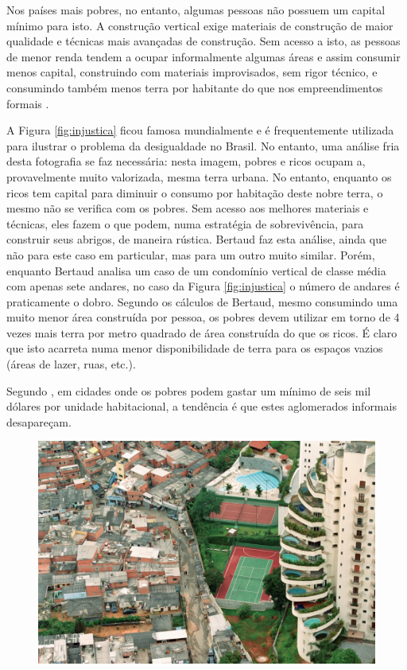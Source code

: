 \documentclass[
	12pt,				%
	oneside,			%
	a4paper,			%
	chapter=TITLE,		%
	section=TITLE,		%
	english,			%
	brazil				%
	]{abntex2}
\begin{document}
\begin{refsection}
Nos países mais pobres, no entanto, algumas pessoas não possuem um capital
mínimo para isto. A construção vertical exige materiais de construção de maior
qualidade e técnicas mais avançadas de construção. Sem acesso a isto, as pessoas
de menor renda tendem a ocupar informalmente algumas áreas e assim consumir
menos capital, construindo com materiais improvisados, sem rigor técnico, e
consumindo também menos terra por habitante do que nos empreendimentos formais
\autocite[p.~236]{bertaud}.

A Figura \ref{fig:injustica} ficou famosa mundialmente e é frequentemente
utilizada para ilustrar o problema da desigualdade no Brasil. No entanto, uma
análise fria desta fotografia se faz necessária: nesta imagem, pobres e ricos
ocupam a, provavelmente muito valorizada, mesma terra urbana. No entanto,
enquanto os ricos tem capital para diminuir o consumo por habitação deste nobre
terra, o mesmo não se verifica com os pobres. Sem acesso aos melhores materiais
e técnicas, eles fazem o que podem, numa estratégia de sobrevivência, para
construir seus abrigos, de maneira rústica. Bertaud \autocite*[p.~236-238]{bertaud} faz
esta análise, ainda que não para este caso em particular, mas para um outro
muito similar. Porém, enquanto Bertaud analisa um caso de um condomínio vertical
de classe média com apenas sete andares, no caso da Figura \ref{fig:injustica}
o número de andares é praticamente o dobro. Segundo os cálculos de Bertaud,
mesmo consumindo uma muito menor área construída por pessoa, os pobres devem
utilizar em torno de 4 vezes mais terra por metro quadrado de área construída do
que os ricos. É claro que isto acarreta numa menor disponibilidade de terra para
os espaços vazios (áreas de lazer, ruas, etc.).

Segundo \textcite[p.~237]{bertaud}, em cidades onde os pobres podem gastar um mínimo de
seis mil dólares por unidade habitacional, a tendência é que estes aglomerados
informais desapareçam.
\begin{figure}[H]

{\centering \includegraphics[width=0.7\linewidth]{images/injustica_SP} 

}
\end{figure}
\end{refsection}
\end{document}
